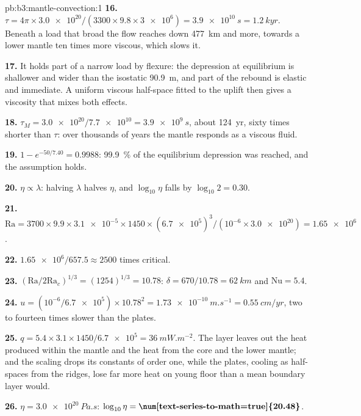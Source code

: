 \begin{solution}{pb:b3:mantle-convection:1}
\textbf{16.} $\tau = 4\pi\times\num{3.0e20}/(3300\times9.8\times\num{3e6}) =
\qty{3.9e10}{s} = \qty{1.2}{kyr}$. Beneath a load that broad the flow reaches
down \qty{477}{km} and more, towards a lower mantle ten times more viscous,
which slows it.

\textbf{17.} It holds part of a narrow load by flexure: the depression at
equilibrium is shallower and wider than the isostatic \qty{90.9}{m}, and part of
the rebound is elastic and immediate. A uniform viscous half-space fitted to
the uplift then gives a viscosity that mixes both effects.

\textbf{18.} $\tau_M = \num{3.0e20}/\num{7.7e10} = \qty{3.9e9}{s}$, about
\qty{124}{yr}, sixty times shorter than $\tau$: over thousands of years the
mantle responds as a viscous fluid.

\textbf{19.} $1 - e^{-50/7.40} = 0.9988$: \qty{99.9}{\percent} of the
equilibrium depression was reached, and the assumption holds.

\textbf{20.} $\eta \propto \lambda$: halving $\lambda$ halves $\eta$, and
$\log_{10}\eta$ falls by $\log_{10}2 = 0.30$.

\textbf{21.} $\mathrm{Ra} = 3700\times9.9\times\num{3.1e-5}\times1450\times
(\num{6.7e5})^3/(10^{-6}\times\num{3.0e20}) = \num{1.65e6}$.

\textbf{22.} $\num{1.65e6}/657.5 \approx 2500$ times critical.

\textbf{23.} $(\mathrm{Ra}/2\mathrm{Ra}_c)^{1/3} = (1254)^{1/3} = 10.78$: $\delta
= 670/10.78 = \qty{62}{km}$ and $\mathrm{Nu} = 5.4$.

\textbf{24.} $u = (10^{-6}/\num{6.7e5})\times10.78^2 = \qty{1.73e-10}{m.s^{-1}}
= \qty{0.55}{cm/yr}$, two to fourteen times slower than the plates.

\textbf{25.} $q = 5.4\times3.1\times1450/\num{6.7e5} = \qty{36}{mW.m^{-2}}$. The
layer leaves out the heat produced within the mantle and the heat from the
core and the lower mantle; and the scaling drops its constants of order one,
while the plates, cooling as half-spaces from the ridges, lose far more heat on
young floor than a mean boundary layer would.

\textbf{26.} $\eta = \qty{3.0e20}{Pa.s}$: $\log_{10}\eta =
\textbf{\num[text-series-to-math=true]{20.48}}$.
\end{solution}
